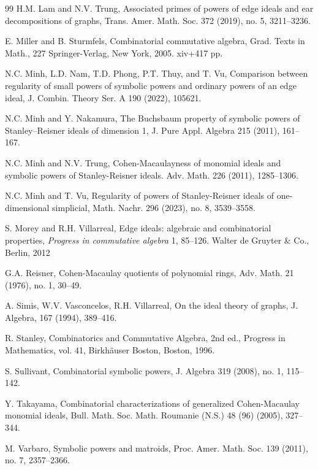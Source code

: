 \documentclass[12pt]{amsart}
\numberwithin{equation}{section}
\theoremstyle{definition}
\theoremstyle{definition}
\begin{document}
\begin{thebibliography}{99}
		 H.M. Lam and N.V. Trung,
		Associated primes of powers of edge ideals and ear decompositions of graphs,
		Trans. Amer. Math. Soc. 372 (2019), no. 5, 3211--3236.
		
		E. Miller and B. Sturmfels, 
		Combinatorial commutative algebra,
		Grad. Texts in Math., 227
		Springer-Verlag, New York, 2005. xiv+417 pp.
		
		 N.C. Minh, L.D. Nam, T.D. Phong, P.T. Thuy, and T. Vu,
		Comparison between regularity of small powers of symbolic powers and ordinary powers of an edge ideal, 
		J. Combin. Theory Ser. A 190 (2022), 105621.
		
		 N.C. Minh and Y. Nakamura, 
		The Buchsbaum property of symbolic powers of Stanley–Reisner ideals of dimension 1,
		J. Pure Appl. Algebra 215 (2011), 161--167.
		
		 N.C. Minh and N.V. Trung,
		Cohen-Macaulayness of monomial ideals and symbolic powers of Stanley-Reisner ideals. Adv. Math. 226 (2011), 1285--1306.
		
		 N.C. Minh and T. Vu,
		Regularity of powers of Stanley-Reisner ideals of one-dimensional simplicial,
		Math. Nachr. 296 (2023), no. 8, 3539--3558.
		
		 S. Morey and R.H. Villarreal,
		 Edge ideals: algebraic and combinatorial properties,
		 \emph{Progress in commutative algebra} 1, 85--126.
		 Walter de Gruyter \& Co., Berlin, 2012
		 
		  G.A. Reisner,
		 Cohen-Macaulay quotients of polynomial rings,
		 Adv. Math. 21 (1976), no. 1, 30--49.
		 
		 
		  A. Simis, W.V. Vasconcelos, R.H. Villarreal,
		 On the ideal theory of graphs,
		 J. Algebra, 167 (1994), 389--416.
		
		 R. Stanley, 
		Combinatorics and Commutative Algebra, 2nd ed., 
		Progress in Mathematics, vol. 41, Birkh\"auser Boston, Boston, 1996.
	
		
		 S. Sullivant,
			Combinatorial symbolic powers,
			J. Algebra 319 (2008), no. 1, 115--142.
		
		 Y. Takayama,
		Combinatorial characterizations of generalized Cohen-Macaulay monomial ideals,
		Bull. Math. Soc. Math. Roumanie (N.S.) 48 (96) (2005), 327--344.
		
		 M. Varbaro,
		Symbolic powers and matroids,
		Proc. Amer. Math. Soc. 139 (2011), no. 7, 2357--2366.
	\end{thebibliography}
	
	
\end{document}
